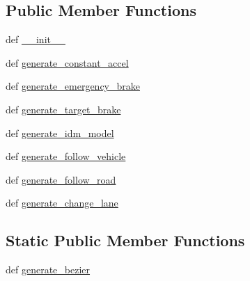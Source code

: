 \subsection*{Public Member Functions}
\begin{DoxyCompactItemize}
\item 
def \hyperlink{classimplementation_1_1oo__realization_1_1trajectory__generation_1_1_trajectory_generator_ad3ad3798257f669909694f156b6ecab7}{\+\_\+\+\_\+init\+\_\+\+\_\+}
\item 
def \hyperlink{classimplementation_1_1oo__realization_1_1trajectory__generation_1_1_trajectory_generator_a535a6cac3733f7c2d3de4b245bb31df7}{generate\+\_\+constant\+\_\+accel}
\item 
def \hyperlink{classimplementation_1_1oo__realization_1_1trajectory__generation_1_1_trajectory_generator_a69500b0c567a77a0d990f1360fdbb74e}{generate\+\_\+emergency\+\_\+brake}
\item 
def \hyperlink{classimplementation_1_1oo__realization_1_1trajectory__generation_1_1_trajectory_generator_a99762d8ce3584d3e7e445ff33e0f3bb7}{generate\+\_\+target\+\_\+brake}
\item 
def \hyperlink{classimplementation_1_1oo__realization_1_1trajectory__generation_1_1_trajectory_generator_aa37900ec51d9615aa3f8807ecdbf0ec2}{generate\+\_\+idm\+\_\+model}
\item 
def \hyperlink{classimplementation_1_1oo__realization_1_1trajectory__generation_1_1_trajectory_generator_a03c12c0c4cfc541518519344dcd5608c}{generate\+\_\+follow\+\_\+vehicle}
\item 
def \hyperlink{classimplementation_1_1oo__realization_1_1trajectory__generation_1_1_trajectory_generator_a302f3cf56ca13a7fb4d5af7758fb0284}{generate\+\_\+follow\+\_\+road}
\item 
def \hyperlink{classimplementation_1_1oo__realization_1_1trajectory__generation_1_1_trajectory_generator_a63fc1f2e43001f8d0fc63dacdcd01ad9}{generate\+\_\+change\+\_\+lane}
\end{DoxyCompactItemize}
\subsection*{Static Public Member Functions}
\begin{DoxyCompactItemize}
\item 
def \hyperlink{classimplementation_1_1oo__realization_1_1trajectory__generation_1_1_trajectory_generator_a7dea310e225c10a4bcfa45a63f66353e}{generate\+\_\+bezier}
\end{DoxyCompactItemize}
